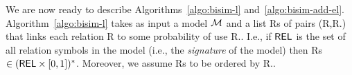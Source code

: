


We are now ready to describe Algorithms~\ref{algo:bisim-l} and~\ref{algo:bisim-add-el}. Algorithm~\ref{algo:bisim-l} takes as input a model $\mathcal{M}$ and a list Rs of pairs (R,R.\puse) that links each relation R to some probability of use R.\puse. I.e., if $\textsf{REL}$ is the set of all relation symbols in the model (i.e., the \emph{signature} of the model) then Rs $\in (\textsf{REL} \times [0,1])^*$. Moreover, we assume Rs to be ordered by R.\puse. 

